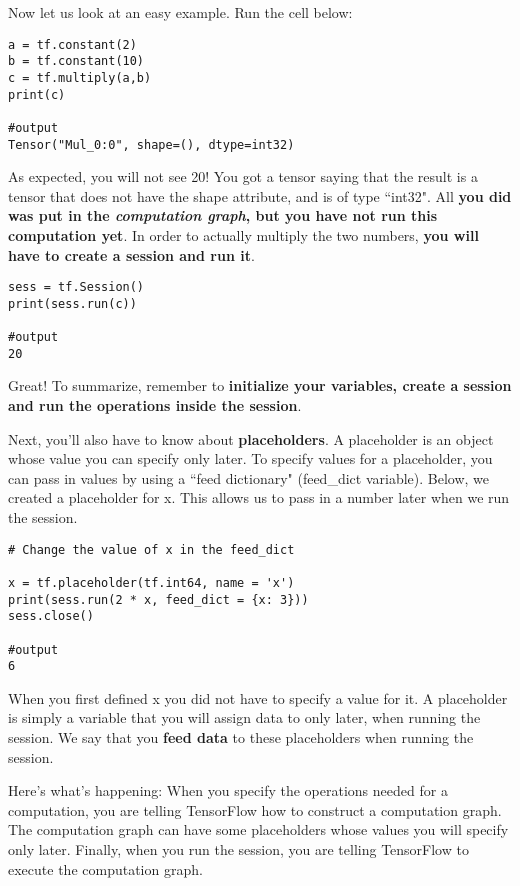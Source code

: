 Now let us look at an easy example. Run the cell below:
\begin{verbatim}
a = tf.constant(2)
b = tf.constant(10)
c = tf.multiply(a,b)
print(c)

#output
Tensor("Mul_0:0", shape=(), dtype=int32)
\end{verbatim}

As expected, you will not see 20! You got a tensor saying that the result is a tensor that does not have the shape attribute, and is of type ``int32". All {\textbf {you did was put in the \emph{computation graph}, but you have not run this computation yet}}. In order to actually multiply the two numbers, {\textbf {you will have to create a session and run it}}.
\begin{verbatim}
sess = tf.Session()
print(sess.run(c))

#output
20
\end{verbatim}


Great! To summarize, remember to {\color{red}\textbf {initialize your variables, create a session and run the operations inside the session}}.

Next, you'll also have to know about {\textbf {placeholders}}. A placeholder is an object whose value you can specify only later. To specify values for a placeholder, you can pass in values by using a ``feed dictionary" (feed\_dict variable). Below, we created a placeholder for x. This allows us to pass in a number later when we run the session.


\begin{verbatim}
# Change the value of x in the feed_dict

x = tf.placeholder(tf.int64, name = 'x')
print(sess.run(2 * x, feed_dict = {x: 3}))
sess.close()

#output
6
\end{verbatim}

When you first defined x you did not have to specify a value for it. A placeholder is simply a variable that you will assign data to only later, when running the session. We say that you {\textbf {feed data}} to these placeholders when running the session.

Here's what's happening: When you specify the operations needed for a computation, you are telling TensorFlow how to construct a computation graph. The computation graph can have some placeholders whose values you will specify only later. Finally, when you run the session, you are telling TensorFlow to execute the computation graph.


